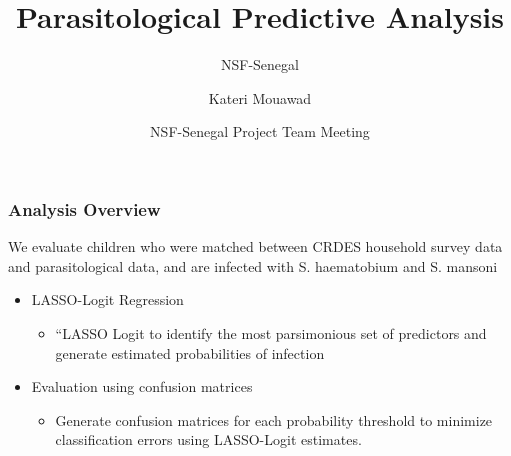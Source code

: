 \documentclass{beamer}
\title[Predictive Analysis] %
{Parasitological Predictive Analysis}
\subtitle{NSF-Senegal}
\author{Kateri Mouawad} %
\date[June 2025] %
{NSF-Senegal Project Team Meeting}
\begin{document}
\frame{\titlepage}

\begin{frame}
\frametitle{Analysis Overview}
We evaluate children who were matched between CRDES household survey data and parasitological data, and are infected with S. haematobium and S. mansoni \\

\begin{itemize}
    \item<1-> LASSO-Logit Regression
       \begin{itemize}
             \item<2-> “LASSO Logit to identify the most parsimonious set of predictors and generate estimated probabilities of infection
        \end{itemize}
    \item<3-> Evaluation using confusion matrices
         \begin{itemize}
                 \item<4-> Generate confusion matrices for each probability threshold to minimize classification errors using LASSO-Logit estimates.
         \end{itemize}
\end{itemize}

\end{frame}
\end{document}
